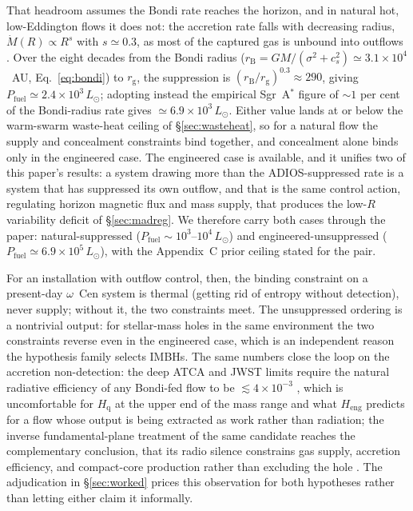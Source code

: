 \documentclass[11pt]{article}
\newcommand{\ocen}{\ensuremath{\omega}~Cen}
\newcommand{\rg}{\ensuremath{r_{\mathrm{g}}}}
\newcommand{\Heng}{\ensuremath{H_{\mathrm{eng}}}}
\newcommand{\Hgas}{\ensuremath{H_{\mathrm{q}}}}
\begin{document}
That headroom assumes the Bondi rate reaches the horizon, and in natural hot, low-Eddington flows it does not: the accretion rate falls with decreasing radius, $\dot{M}(R) \propto R^{s}$ with $s \simeq 0.3$, as most of the captured gas is unbound into outflows \citep{BlandfordBegelman1999,YuanNarayan2014}. Over the eight decades from the Bondi radius ($r_{\mathrm{B}} = GM/(\sigma^{2}
+c_{s}^{2}) \simeq 3.1\times10^{4}$~AU, Eq.~\ref{eq:bondi}) to $\rg$, the
suppression is $(r_{\mathrm{B}}/\rg)^{0.3} \approx 290$, giving
$P_{\mathrm{fuel}} \simeq 2.4\times10^{3}\,L_{\odot}$; adopting instead the empirical Sgr~A$^{*}$ figure of $\sim 1$ per cent of the Bondi-radius rate gives $\simeq 6.9\times10^{3}\,L_{\odot}$. Either value lands at or below the warm-swarm waste-heat ceiling of \S\ref{sec:wasteheat}, so for a natural flow the supply and concealment constraints bind together, and concealment alone binds only in the engineered case. The engineered case is available, and it unifies two of this paper's results: a system drawing more than the ADIOS-suppressed rate is a system that has suppressed its own outflow, and that is the same control action, regulating horizon magnetic flux and mass supply, that produces the low-$R$ variability deficit of \S\ref{sec:madreg}. We therefore carry both cases through the paper: natural-suppressed ($P_{\mathrm{fuel}} \sim 10^{3}$--$10^{4}\,L_{\odot}$) and engineered-unsuppressed ($P_{\mathrm{fuel}} \simeq 6.9\times10^{5}\,L_{\odot}$), with the Appendix~C prior ceiling stated for the pair.

For an installation with outflow control, then, the binding constraint on a present-day \ocen{} system is thermal (getting rid of entropy without detection), never supply; without it, the two constraints meet. The unsuppressed ordering is a nontrivial output: for stellar-mass holes in the same environment the two constraints reverse even in the engineered case, which is an independent reason the hypothesis family selects IMBHs. The same numbers close the loop on the accretion non-detection: the deep ATCA and JWST limits require the natural radiative efficiency of any Bondi-fed flow to be $\lesssim 4\times10^{-3}$ \citep{Mahida2026,Chen2025JWST}, which is uncomfortable for \Hgas{} at the upper end of the mass range and what \Heng{} predicts for a flow whose output is being extracted as work rather than radiation; the inverse fundamental-plane treatment of the same candidate reaches the complementary conclusion, that its radio silence constrains gas supply, accretion efficiency, and compact-core production rather than excluding the hole \citep{Abbassi2026}. The adjudication in \S\ref{sec:worked} prices this observation for both hypotheses rather than letting either claim it informally.
\end{document}
